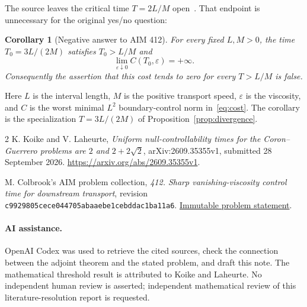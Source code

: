 \documentclass[11pt]{article}
\newtheorem{corollary}[proposition]{Corollary}
\begin{document}
The source leaves the critical time $T=2L/M$ open~\cite[PDF p.~5]{kl}.
That endpoint is unnecessary for the original yes/no question:

\begin{corollary}[Negative answer to AIM 412]
For every fixed $L,M>0$, the time $T_0=3L/(2M)$ satisfies $T_0>L/M$ and
\[
\lim_{\varepsilon\downarrow0}C(T_0,\varepsilon)=+\infty.
\]
Consequently the assertion that this cost tends to zero for every
$T>L/M$ is false.
\end{corollary}
Here $L$ is the interval length, $M$ is the positive transport speed,
$\varepsilon$ is the viscosity, and $C$ is the worst minimal $L^2$
boundary-control norm in~\eqref{eq:cost}.
The corollary is the specialization $T=3L/(2M)$ of
Proposition~\ref{prop:divergence}.

\begin{thebibliography}{2}
K. Koike and V. Laheurte,
\emph{Uniform null-controllability times for the Coron--Guerrero problems
are $2$ and $2+2\sqrt2$},
arXiv:2609.35355v1, submitted 28 September 2026.
\url{https://arxiv.org/abs/2609.35355v1}.

M. Colbrook's AIM problem collection,
\emph{412. Sharp vanishing-viscosity control time for downstream transport},
revision \texttt{c9929805cece044705abaaebe1cebddac1ba11a6}.
\href{https://github.com/MColbrook/AIM/blob/c9929805cece044705abaaebe1cebddac1ba11a6/problems/412-positive-transport-sharp-uniform-control-time.md}{Immutable problem statement}.
\end{thebibliography}

\paragraph{AI assistance.}
OpenAI Codex was used to retrieve the cited sources, check the connection
between the adjoint theorem and the stated problem, and draft this note.
The mathematical threshold result is attributed to Koike and Laheurte.
No independent human review is asserted; independent mathematical review
of this literature-resolution report is requested.
\end{document}
